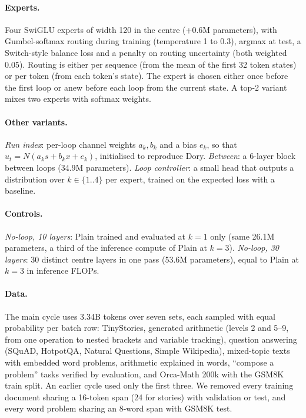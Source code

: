 \documentclass[11pt]{article}
\begin{document}
\paragraph{Experts.} Four SwiGLU experts of width 120 in the centre (+0.6M parameters), with Gumbel-softmax routing during training (temperature 1 to 0.3), argmax at test, a Switch-style balance loss \cite{switch} and a penalty on routing uncertainty (both weighted 0.05). Routing is either per sequence (from the mean of the first 32 token states) or per token (from each token's state). The expert is chosen either once before the first loop or anew before each loop from the current state. A top-2 variant mixes two experts with softmax weights.

\paragraph{Other variants.} \emph{Run index}: per-loop channel weights $a_k, b_k$ and a bias $e_k$, so that $u_t=N(a_k s+b_k x+e_k)$, initialised to reproduce Dory. \emph{Between}: a 6-layer block between loops (34.9M parameters). \emph{Loop controller}: a small head that outputs a distribution over $k\in\{1..4\}$ per expert, trained on the expected loss with a baseline.

\paragraph{Controls.} \emph{No-loop, 10 layers}: Plain trained and evaluated at $k{=}1$ only (same 26.1M parameters, a third of the inference compute of Plain at $k{=}3$). \emph{No-loop, 30 layers}: 30 distinct centre layers in one pass (53.6M parameters), equal to Plain at $k{=}3$ in inference FLOPs.

\paragraph{Data.} The main cycle uses 3.34B tokens over seven sets, each sampled with equal probability per batch row: TinyStories, generated arithmetic (levels 2 and 5--9, from one operation to nested brackets and variable tracking), question answering (SQuAD, HotpotQA, Natural Questions, Simple Wikipedia), mixed-topic texts with embedded word problems, arithmetic explained in words, ``compose a problem'' tasks verified by evaluation, and Orca-Math 200k with the GSM8K train split. An earlier cycle used only the first three. We removed every training document sharing a 16-token span (24 for stories) with validation or test, and every word problem sharing an 8-word span with GSM8K test.
\end{document}
